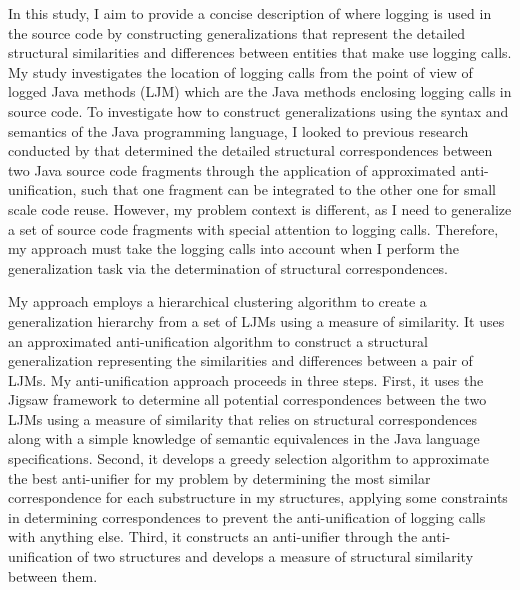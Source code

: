 In this study, I aim to provide a concise description of where logging is used in the source code by constructing generalizations that represent the detailed structural similarities and differences between entities that make use logging calls. My study investigates the location of logging calls from the point of view of logged Java methods (LJM) which are the Java methods enclosing logging calls in source code. To investigate how to construct generalizations using the syntax and semantics of the Java programming language, I looked to previous research conducted by \citet{2008:fse:cottrell} that determined the detailed structural correspondences between two Java source code fragments through the application of approximated anti-unification, such that one fragment can be integrated to the other one for small scale code reuse. However, my problem context is different, as I need to generalize a set of source code fragments with special attention to logging calls. Therefore, my approach must take the logging calls into account when I perform the generalization task via the determination of structural correspondences.


My approach employs a hierarchical clustering algorithm to create a generalization hierarchy from a set of LJMs using a measure of similarity. It uses an approximated anti-unification algorithm to construct a structural generalization representing the similarities and differences between a pair of LJMs. My anti-unification approach proceeds in three steps. First, it uses the Jigsaw framework \cite{2008:fse:cottrell} to determine all potential correspondences between the two LJMs using a measure of similarity that relies on structural correspondences along with a simple knowledge of semantic equivalences in the Java language specifications. Second, it develops a greedy selection algorithm to approximate the best anti-unifier for my problem by determining the most similar correspondence for each substructure in my structures, applying some constraints in determining correspondences to prevent the anti-unification of logging calls with anything else. Third, it constructs an anti-unifier through the anti-unification of two structures and develops a measure of structural similarity between them.


